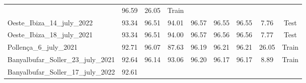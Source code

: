 \begin{table}[H]
{\begin{tabular}{lcccccccc}
                                                   & 96.59
                                                   & 26.05
                                                   & {\color[HTML]{66c2a5}
                    Train}
            \\
            Oeste\_Ibiza\_14\_july\_2022           & 93.34
                                                   & 96.51
                                                   & 94.01
                                                   & 96.57
                                                   & 96.55
                                                   & 96.55
                                                   & 7.76
                                                   & {\color[HTML]{fc8d62}
                    Test}
            \\
            Oeste\_Ibiza\_18\_july\_2021           & 93.34
                                                   & 96.51
                                                   & 94.00
                                                   & 96.57
                                                   & 96.56
                                                   & 96.56
                                                   & 7.77
                                                   & {\color[HTML]{fc8d62}
                    Test}
            \\
            Pollença\_6\_july\_2021                & 92.71
                                                   & 96.07
                                                   & 87.63
                                                   & 96.19
                                                   & 96.21
                                                   & 96.21
                                                   & 26.05
                                                   & {\color[HTML]{66c2a5}
                    Train}
            \\
            Banyalbufar\_Soller\_23\_july\_2021    & 92.64
                                                   & 96.14
                                                   & 93.06
                                                   & 96.20
                                                   & 96.17
                                                   & 96.17
                                                   & 8.89
                                                   & {\color[HTML]{66c2a5}
                    Train}
            \\
            Banyalbufar\_Soller\_17\_july\_2022    & 92.61

\end{tabular}}
\end{table}
